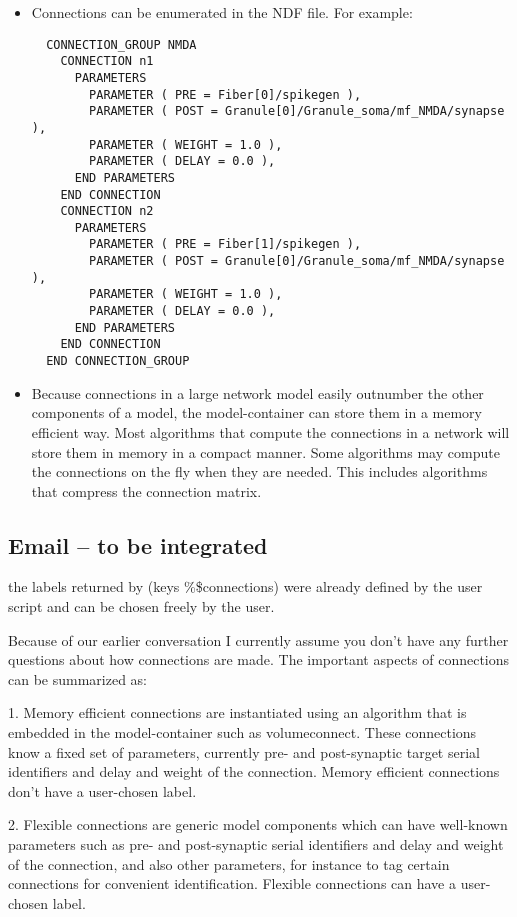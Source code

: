 \documentclass[12pt]{article}
\begin{document}
\begin{itemize}
\item Connections can be enumerated in the NDF file.  For example:
\begin{verbatim}
  CONNECTION_GROUP NMDA
    CONNECTION n1
      PARAMETERS
        PARAMETER ( PRE = Fiber[0]/spikegen ),
        PARAMETER ( POST = Granule[0]/Granule_soma/mf_NMDA/synapse ),
        PARAMETER ( WEIGHT = 1.0 ),
        PARAMETER ( DELAY = 0.0 ),
      END PARAMETERS
    END CONNECTION
    CONNECTION n2
      PARAMETERS
        PARAMETER ( PRE = Fiber[1]/spikegen ),
        PARAMETER ( POST = Granule[0]/Granule_soma/mf_NMDA/synapse ),
        PARAMETER ( WEIGHT = 1.0 ),
        PARAMETER ( DELAY = 0.0 ),
      END PARAMETERS
    END CONNECTION
  END CONNECTION_GROUP
\end{verbatim}
\item Because connections in a large network model easily outnumber
  the other components of a model, the model-container can store them
  in a memory efficient way.  Most algorithms that compute the
  connections in a network will store them in memory in a compact
  manner.  Some algorithms may compute the connections on the fly when
  they are needed.  This includes algorithms that compress the
  connection matrix.
\end{itemize}



\subsection*{Email -- to be integrated}

the labels returned by (keys \%\$connections)
were already defined by the user script and can be chosen freely by
the user.

Because of our earlier conversation I currently assume you don't have
any further questions about how connections are made.  The important
aspects of connections can be summarized as:

1. Memory efficient connections are instantiated using an algorithm
that is embedded in the model-container such as volumeconnect.  These
connections know a fixed set of parameters, currently pre- and
post-synaptic target serial identifiers and delay and weight of the
connection.  Memory efficient connections don't have a user-chosen
label.

2. Flexible connections are generic model components which can have
well-known parameters such as pre- and post-synaptic serial
identifiers and delay and weight of the connection, and also other
parameters, for instance to tag certain connections for convenient
identification.  Flexible connections can have a user-chosen label.
\end{document}
